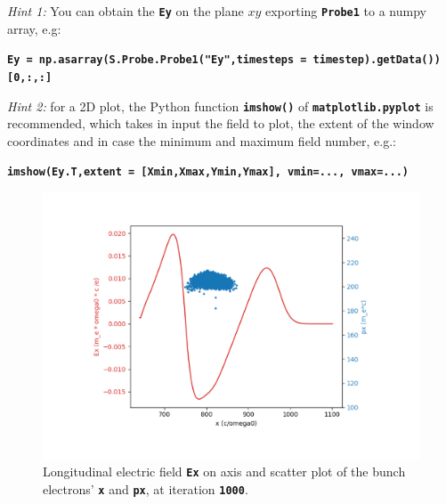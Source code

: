 \documentclass[a4paper,12pt]{extarticle}
\newcommand{\commandline}[1]{\texttt{\textbf{#1}}}
\begin{document}
\textit{Hint 1:} You can obtain the \commandline{Ey} on the plane $xy$ exporting \commandline{Probe1} to a numpy array, e.g:

\commandline{Ey = np.asarray(S.Probe.Probe1("Ey",timesteps = timestep).getData())[0,:,:]}

\textit{Hint 2:} for a 2D plot, the Python function \commandline{imshow()} of \commandline{matplotlib.pyplot} is recommended, which takes in input the field to plot, the extent of the window coordinates and in case the minimum and maximum field number, e.g.:

\commandline{imshow(Ey.T,extent = [Xmin,Xmax,Ymin,Ymax], vmin=..., vmax=...)}

\begin{figure}[!htb]
   \begin{minipage}{0.48\textwidth}
     \centering
     \includegraphics[width=1\linewidth]{ExScatterXPx.pdf}
     \caption{Longitudinal electric field \commandline{Ex} on axis and scatter plot of the bunch electrons' \commandline{x} and \commandline{px}, at iteration \commandline{1000}. }\label{ExScatterXPx}
   \end{minipage}\hfill
   \begin{minipage}{0.48\textwidth}
     \centering

\end{minipage}
\end{figure}
\end{document}

